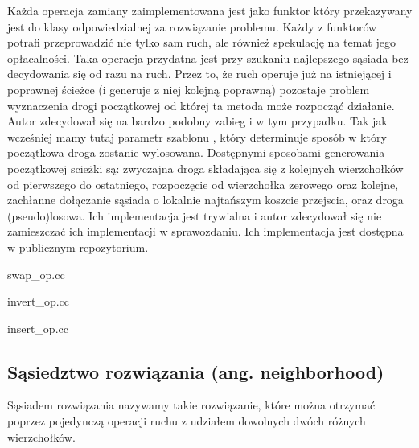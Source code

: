 \documentclass[polish,polish,a4paper]{article}
\begin{document}
\par
Każda operacja zamiany zaimplementowana jest jako funktor który przekazywany jest do klasy odpowiedzialnej za rozwiązanie problemu.
Każdy z funktorów potrafi przeprowadzić nie tylko sam ruch, ale również spekulację na temat jego opłacalności. Taka operacja 
przydatna jest przy szukaniu najlepszego sąsiada bez decydowania się od razu na ruch. Przez to, że ruch operuje już na istniejącej
i poprawnej ścieżce (i generuje z niej kolejną poprawną) pozostaje problem wyznaczenia drogi początkowej od której ta metoda może
rozpocząć działanie. Autor zdecydował się na bardzo podobny zabieg i w tym przypadku. Tak jak wcześniej mamy tutaj parametr szablonu
, który determinuje sposób w który początkowa droga zostanie wylosowana. Dostępnymi sposobami generowania początkowej scieżki są:
zwyczajna droga składająca się z kolejnych wierzchołków od pierwszego do ostatniego, rozpoczęcie od wierzchołka zerowego oraz
kolejne, zachłanne dołączanie sąsiada o lokalnie najtańszym koszcie przejscia, oraz droga (pseudo)losowa. Ich implementacja jest
trywialna i autor zdecydował się nie zamieszczać ich implementacji w sprawozdaniu. Ich implementacja jest dostępna w publicznym
repozytorium.

\pagebreak

{swap_op.cc}

\pagebreak

{invert_op.cc}

\pagebreak

{insert_op.cc}

\subsection{Sąsiedztwo rozwiązania (ang. neighborhood)}
Sąsiadem rozwiązania nazywamy takie rozwiązanie, które można otrzymać poprzez pojedynczą operacji ruchu z udziałem dowolnych
dwóch różnych wierzchołków.
\end{document}
